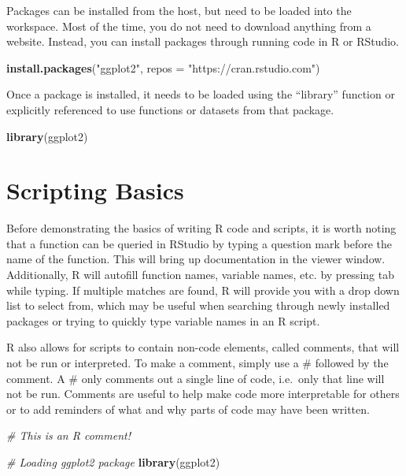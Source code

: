 \documentclass[
]{book}
\newenvironment{Shaded}{\begin{snugshade}}{\end{snugshade}}
\newcommand{\CommentTok}[1]{\textcolor[rgb]{0.56,0.35,0.01}{\textit{#1}}}
\newcommand{\DataTypeTok}[1]{\textcolor[rgb]{0.13,0.29,0.53}{#1}}
\newcommand{\KeywordTok}[1]{\textcolor[rgb]{0.13,0.29,0.53}{\textbf{#1}}}
\newcommand{\NormalTok}[1]{#1}
\newcommand{\StringTok}[1]{\textcolor[rgb]{0.31,0.60,0.02}{#1}}
\begin{document}
Packages can be installed from the host, but need to be loaded into the workspace. Most of the time, you do not need to download anything from a website. Instead, you can install packages through running code in R or RStudio.

\begin{Shaded}
\begin{Highlighting}[]
\KeywordTok{install.packages}\NormalTok{(}\StringTok{"ggplot2"}\NormalTok{, }\DataTypeTok{repos =} \StringTok{"https://cran.rstudio.com"}\NormalTok{)}
\end{Highlighting}
\end{Shaded}

Once a package is installed, it needs to be loaded using the ``library'' function or explicitly referenced to use functions or datasets from that package.

\begin{Shaded}
\begin{Highlighting}[]
\KeywordTok{library}\NormalTok{(ggplot2)}
\end{Highlighting}
\end{Shaded}

\hypertarget{scripting-basics}{%
\section{Scripting Basics}\label{scripting-basics}}

Before demonstrating the basics of writing R code and scripts, it is worth noting that a function can be queried in RStudio by typing a question mark before the name of the function. This will bring up documentation in the viewer window. Additionally, R will autofill function names, variable names, etc. by pressing tab while typing. If multiple matches are found, R will provide you with a drop down list to select from, which may be useful when searching through newly installed packages or trying to quickly type variable names in an R script.

R also allows for scripts to contain non-code elements, called comments, that will not be run or interpreted. To make a comment, simply use a \# followed by the comment. A \# only comments out a single line of code, i.e.~only that line will not be run. Comments are useful to help make code more interpretable for others or to add reminders of what and why parts of code may have been written.

\begin{Shaded}
\begin{Highlighting}[]
\CommentTok{# This is an R comment!}

\CommentTok{# Loading ggplot2 package}
\KeywordTok{library}\NormalTok{(ggplot2)}
\end{Highlighting}
\end{Shaded}
\end{document}
